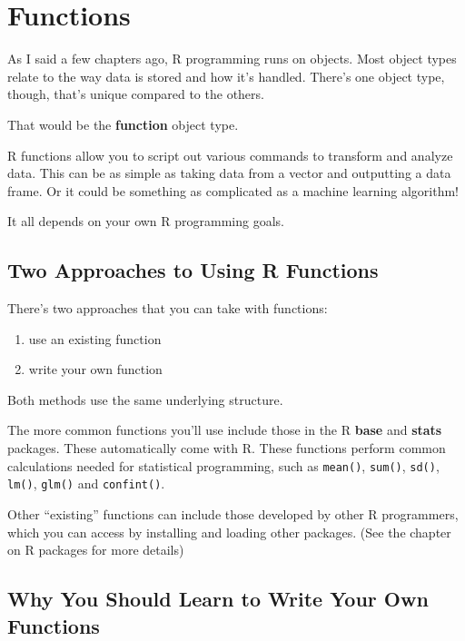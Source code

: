 \documentclass[
]{book}
\providecommand{\tightlist}{%
  \setlength{\itemsep}{0pt}\setlength{\parskip}{0pt}}
\begin{document}
\begin{center}
\hypertarget{functions}{%
\chapter{Functions}\label{functions}}

As I said a few chapters ago, R programming runs on objects. Most object types relate to the way data is stored and how it's handled. There's one object type, though, that's unique compared to the others.

That would be the \textbf{function} object type.

R functions allow you to script out various commands to transform and analyze data. This can be as simple as taking data from a vector and outputting a data frame. Or it could be something as complicated as a machine learning algorithm!

It all depends on your own R programming goals.

\hypertarget{two-approaches-to-using-r-functions}{%
\section{Two Approaches to Using R Functions}\label{two-approaches-to-using-r-functions}}

There's two approaches that you can take with functions:

\begin{enumerate}
\def\labelenumi{\arabic{enumi}.}
\tightlist
\item
  use an existing function
\item
  write your own function
\end{enumerate}

Both methods use the same underlying structure.

The more common functions you'll use include those in the R \textbf{base} and \textbf{stats} packages. These automatically come with R. These functions perform common calculations needed for statistical programming, such as \texttt{mean()}, \texttt{sum()}, \texttt{sd()}, \texttt{lm()}, \texttt{glm()} and \texttt{confint()}.

Other ``existing'' functions can include those developed by other R programmers, which you can access by installing and loading other packages. (See the chapter on R packages for more details)

\hypertarget{why-you-should-learn-to-write-your-own-functions}{%
\section{Why You Should Learn to Write Your Own Functions}\label{why-you-should-learn-to-write-your-own-functions}}


\end{center}
\end{document}
